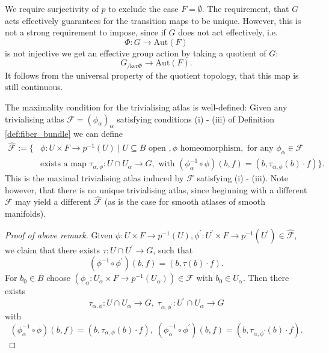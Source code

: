 \begin{remark}
    We require surjectivity of $p$ to exclude the case $F = \emptyset$. The requirement, that $G$ acts effectively guarantees for the transition maps to be unique. However, this is not a strong requirement to impose, since if $G$ does not act effectively, i.e.
    \[
    \Phi \colon G \to \mathrm{Aut}(F)
    \]
    is not injective we get an effective group action by taking a quotient of $G$:
    \[
    G_{/\mathrm{ker}\Phi} \to \mathrm{Aut}(F).
    \]
    It follows from the universal property of the quotient topology, that this map is still continuous.
\end{remark}

\begin{remark}
    The maximality condition for the trivialising atlas is well-defined: Given any trivialising atlas $\mathcal{F} = (\phi_\alpha)_\alpha$ satisfying conditions (i) - (iii) of Definition \ref{def:fiber_bundle} we can define
    \begin{align*}
        \hat{\mathcal{F}} := \{& \phi \colon U \times F \to p^{-1}(U) \mid U \subseteq B \text{ open }, \phi \text{ homeomorphism},  \text{ for any } \phi_\alpha \in \mathcal{F} \\ &\text{exists a map } \tau_{\alpha,\phi} \colon U \cap U_\alpha \to G, \text{ with } (\phi_\alpha^{-1} \circ \phi)(b,f) = (b,\tau_{\alpha,\phi}(b) \cdot f) \}.
    \end{align*}
    This is the maximal trivialising atlas induced by $\mathcal{F}$ satisfying (i) - (iii). Note however, that there is no unique trivialising atlas, since beginning with a different $\mathcal{F}$ may yield a different $\hat{\mathcal{F}}$ (as is the case for smooth atlases of smooth manifolds).
    \begin{proof}[Proof of above remark]
        Given $\phi \colon U \times F \to p^{-1}(U), \phi^\prime \colon U^\prime \times F \to p^{-1}(U^\prime) \in \hat{\mathcal{F}}$, we claim that there exists $\tau \colon U \cap U^\prime \to G$, such that
        \[
        (\phi^{-1} \circ \phi^\prime)(b,f) = (b,\tau(b) \cdot f).
        \]
        For $b_0 \in B$ choose $(\phi_\alpha \colon U_\alpha \times F \to p^{-1}(U_\alpha)) \in \mathcal{F}$ with $b_0 \in U_\alpha$. Then there exists
        \[
        \tau_{\alpha,\phi} \colon U \cap U_\alpha \to G, \; \tau_{\alpha,\phi^\prime} \colon U^\prime \cap U_\alpha \to G
        \]
        with
        \[
        (\phi^{-1}_\alpha \circ \phi)(b,f) = (b,\tau_{\alpha,\phi}(b) \cdot f), \; 
        (\phi^{-1}_\alpha \circ \phi^\prime)(b,f) = (b,\tau_{\alpha,\phi^\prime}(b) \cdot f).
\]
\end{proof}
\end{remark}
